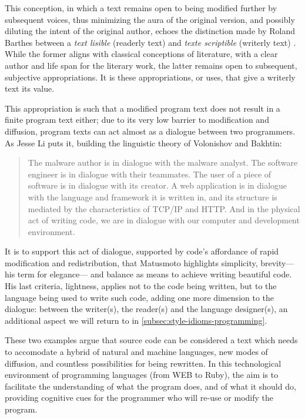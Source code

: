 This conception, in which a text remains open to being modified further by subsequent voices, thus minimizing the aura of the original version, and possibly diluting the intent of the original author, echoes the distinction made by Roland Barthes between a \emph{text lisible} (readerly text) and \emph{texte scriptible} (writerly text) \citep{barthes_sz_1977}. While the former aligns with classical conceptions of literature, with a clear author and life span for the literary work, the latter remains open to subsequent, subjective appropriations. It is these appropriations, or uses, that give a writerly text its value.

This appropriation is such that a modified program text does not result in a finite program text either; due to its very low barrier to modification and diffusion, program texts can act almost as a dialogue between two programmers. As Jesse Li puts it, building the linguistic theory of Volonishov and Bakhtin:

\begin{quote}
  The malware author is in dialogue with the malware analyst. The software engineer is in dialogue with their teammates. The user of a piece of software is in dialogue with its creator. A web application is in dialogue with the language and framework it is written in, and its structure is mediated by the characteristics of TCP/IP and HTTP. And in the physical act of writing code, we are in dialogue with our computer and development environment. \citep{li_where_2020}
\end{quote}

It is to support this act of dialogue, supported by code's affordance of rapid modification and redistribution, that Matusmoto highlights simplicity, brevity—his term for elegance— and balance as means to achieve writing beautiful code. His last criteria, lightness, applies not to the code being written, but to the language being used to write such code, adding one more dimension to the dialogue: between the writer(s), the reader(s) and the language designer(s), an additional aspect we will return to in \ref{subsec:style-idioms-programming}.

These two examples argue that source code can be considered a text which needs to accomodate a hybrid of natural and machine languages, new modes of diffusion, and countless possibilities for being rewritten. In this technological environment of programming languages (from WEB to Ruby), the aim is to facilitate the understanding of what the program does, and of what it should do, providing cognitive cues for the programmer who will re-use or modify the program.

